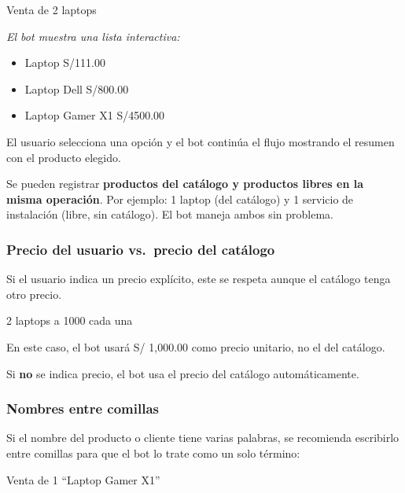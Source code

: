 \documentclass[12pt,a4paper]{article}
\begin{document}
\begin{mensajeusuario}
Venta de 2 laptops
\end{mensajeusuario}

\begin{mensajebot}
\textit{El bot muestra una lista interactiva:}
\begin{itemize}[label=\textbullet]
    \item Laptop S/111.00
    \item Laptop Dell S/800.00
    \item Laptop Gamer X1 S/4500.00
\end{itemize}
\end{mensajebot}

El usuario selecciona una opci\'on y el bot contin\'ua el flujo mostrando el resumen con el producto elegido.

\begin{notaimportante}
Se pueden registrar \textbf{productos del cat\'alogo y productos libres en la misma operaci\'on}. Por ejemplo: 1 laptop (del cat\'alogo) y 1 servicio de instalaci\'on (libre, sin cat\'alogo). El bot maneja ambos sin problema.
\end{notaimportante}

\subsubsection{Precio del usuario vs.\ precio del cat\'alogo}

Si el usuario indica un precio expl\'icito, este se respeta aunque el cat\'alogo tenga otro precio.

\begin{mensajeusuario}
2 laptops a 1000 cada una
\end{mensajeusuario}

En este caso, el bot usar\'a S/ 1,000.00 como precio unitario, no el del cat\'alogo.

Si \textbf{no} se indica precio, el bot usa el precio del cat\'alogo autom\'aticamente.

\subsubsection{Nombres entre comillas}

Si el nombre del producto o cliente tiene varias palabras, se recomienda escribirlo entre comillas para que el bot lo trate como un solo t\'ermino:

\begin{mensajeusuario}
Venta de 1 ``Laptop Gamer X1''
\end{mensajeusuario}
\end{document}
